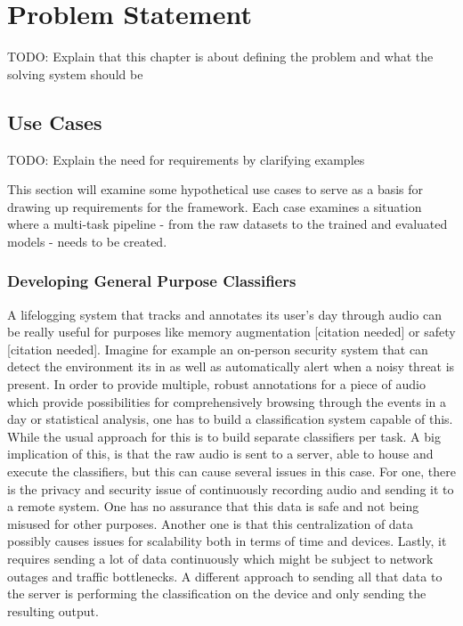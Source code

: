\chapter{Problem Statement} \label{problem}
TODO: Explain that this chapter is about defining the problem and what the solving system should be

\section{Use Cases}
TODO: Explain the need for requirements by clarifying examples

This section will examine some hypothetical use cases to serve as a basis for drawing up requirements for the framework. Each case examines a situation where a multi-task pipeline - from the raw datasets to the trained and evaluated models - needs to be created. 


\subsection{Developing General Purpose Classifiers}

A lifelogging system that tracks and annotates its user's day through audio can be really useful for purposes like memory augmentation [citation needed] or safety [citation needed]. Imagine for example an on-person security system that can detect the environment its in as well as automatically alert when a noisy threat is present. In order to provide multiple, robust annotations for a piece of audio which provide possibilities for comprehensively browsing through the events in a day or statistical analysis, one has to build a classification system capable of this. While the usual approach for this is to build separate classifiers per task. A big implication of this, is that the raw audio is sent to a server, able to house and execute the classifiers, but this can cause several issues in this case. For one, there is the privacy and security issue of continuously recording audio and sending it to a remote system. One has no assurance that this data is safe and not being misused for other purposes. Another one is that this centralization of data possibly causes issues for scalability both in terms of time and devices. Lastly, it requires sending a lot of data continuously which might be subject to network outages and traffic bottlenecks. A different approach to sending all that data to the server is performing the classification on the device and only sending the resulting output.\\

